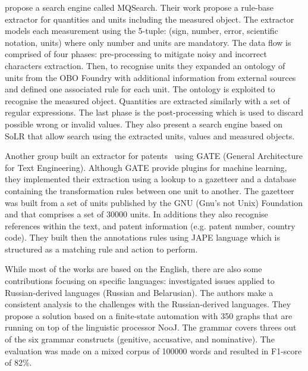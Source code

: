 \documentclass[12pt, a4paper]{report}
\begin{document}
\cite{maiya2015mining} propose a search engine called MQSearch. Their work propose a rule-base extractor for quantities and units including the measured object. The extractor models each measurement using the 5-tuple: (sign, number, error, scientific notation, units) where only number and units are mandatory. 
The data flow is comprised of four phases: pre-processing to mitigate noisy and incorrect characters extraction. 
Then, to recognise units they expanded an ontology of units from the OBO Foundry with additional information from external sources and defined one associated rule for each unit. The ontology is exploited to recognise the measured object. 
Quantities are extracted similarly with a set of regular expressions. 
The last phase is the post-processing which is used to discard possible wrong or invalid values. 
They also present a search engine based on SoLR that allow search using the extracted units, values and measured objects. 

Another group built an extractor for patents~\cite{agatonovic2008large} using GATE (General Architecture for Text Engineering). 
Although GATE provide plugins for machine learning, they implemented their extraction using a lookup to a gazetteer and a database containing the transformation rules between one unit to another. 
The gazetteer was built from a set of units published by the GNU (Gnu's not Unix) Foundation and that comprises a set of 30000 units. In additions they also recognise references within the text, and patent information (e.g. patent number, country code). 
They built then the annotations rules using JAPE language which is structured as a matching rule and action to perform. 

While most of the works are based on the English, there are also some contributions focusing on specific languages: \cite{hetsevich2014processing} investigated issues applied to Russian-derived languages (Russian and Belarusian). 
The authors make a consistent analysis to the challenges with the Russian-derived languages. 
They propose a solution based on a finite-state automation with 350 graphs that are running on top of the linguistic processor NooJ. 
The grammar covers threes out of the six grammar constructs (genitive, accusative, and nominative). 
The evaluation was made on a mixed corpus of 100000 words and resulted in F1-score of 82\%. 
\end{document}
